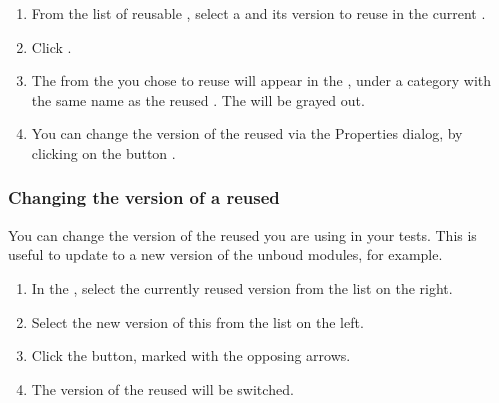 \begin{enumerate}
\item From the list of reusable \gdprojects{}, select a \gdproject{} and its version to reuse in the current \gdproject{}. 
\item Click . 
\item The \gdcases{} from the \gdproject{} you chose to reuse will appear in the \gdtestcasebrowser{}, under a category with the same name as the reused \gdproject{}. The \gdcases{} will be grayed out. 

\item You can change the version of the reused \gdproject{} via the  Properties dialog, by clicking on the  button .
\end{enumerate}

\subsubsection{Changing the version of a reused \gdproject{}}
\label{changingreusedprojectversion}
You can change the version of the reused \gdproject{} you are using in your tests. This is useful to update to a new version of the unboud modules, for example. 
\begin{enumerate}
\item In the , select the currently reused \gdproject{} version from the list on the right. 
\item Select the new version of this \gdproject{} from the list on the left. 
\item Click the  button, marked with the opposing arrows. 
\item The version of the reused \gdproject{} will be switched. 
\end{enumerate}
